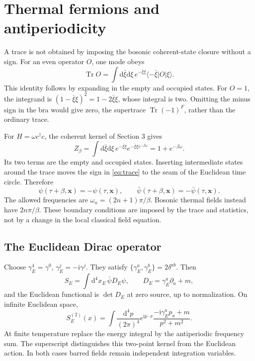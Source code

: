 \documentclass[11pt]{article}
\newcommand{\dd}{\mathrm d}
\newcommand{\ii}{\mathrm i}
\newcommand{\Tr}{\operatorname{Tr}}
\newcommand{\module}[1]{\clearpage\section{#1}}
\begin{document}
\module{Thermal fermions and antiperiodicity}
A trace is not obtained by imposing the bosonic coherent-state closure
without a sign. For an even operator \(O\), one mode obeys
\begin{equation}
 \Tr O=\int\dd\bar\xi\dd\xi\,e^{-\bar\xi\xi}
 \langle-\bar\xi|O|\xi\rangle.                      \label{eq:trace}
\end{equation}
This identity follows by expanding in the empty and occupied states.
For \(O=1\), the integrand is
\((1-\bar\xi\xi)^2=1-2\bar\xi\xi\), whose integral is two.
Omitting the minus sign in the bra would give zero, the supertrace
\(\Tr(-1)^F\), rather than the ordinary trace.

For \(H=\omega c^\dagger c\), the coherent kernel of Section 3 gives
\begin{equation}
 Z_\beta=\int\dd\bar\xi\dd\xi\,e^{-\bar\xi\xi}
 e^{-\bar\xi\xi e^{-\beta\omega}}
 =1+e^{-\beta\omega}.
\end{equation}
Its two terms are the empty and occupied states. Inserting intermediate
states around the trace moves the sign in \eqref{eq:trace} to the seam
of the Euclidean time circle. Therefore
\begin{equation}
 \psi(\tau+\beta,\bm x)=-\psi(\tau,\bm x),\qquad
 \bar\psi(\tau+\beta,\bm x)=-\bar\psi(\tau,\bm x).
                                                        \label{eq:AP}
\end{equation}
The allowed frequencies are \(\omega_n=(2n+1)\pi/\beta\). Bosonic
thermal fields instead have \(2n\pi/\beta\). These boundary conditions
are imposed by the trace and statistics, not by a change in the local
classical field equation.

\subsection{The Euclidean Dirac operator}
Choose \(\gamma_E^4=\gamma^0\), \(\gamma_E^j=-\ii\gamma^j\).
They satisfy \(\{\gamma_E^a,\gamma_E^b\}=2\delta^{ab}\). Then
\begin{equation}
 S_E=\int\dd^4x_E\,\bar\psi D_E\psi,\qquad
 D_E=\gamma_E^a\partial_a+m,
\end{equation}
and the Euclidean functional is \(\det D_E\) at zero source, up to
normalization. On infinite Euclidean space,
\begin{equation}
 S_E^{(2)}(x)=\int\frac{\dd^4p}{(2\pi)^4}e^{\ii p\cdot x}
 \frac{-\ii\gamma_E^ap_a+m}{p^2+m^2}.
\end{equation}
At finite temperature replace the energy integral by the antiperiodic
frequency sum. The superscript distinguishes this two-point kernel
from the Euclidean action. In both cases barred fields remain
independent integration variables.
\end{document}
